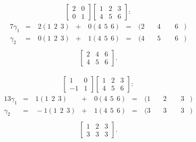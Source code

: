 \documentclass[12pt]{article}
\begin{document}
\begin{exm}
  \begin{align*}
    \begin{bmatrix}
      2 & 0\\
      0 & 1
    \end{bmatrix}
    \begin{bmatrix}
      1 & 2 & 3\\
      4 & 5 & 6
    \end{bmatrix}:
  \end{align*}
  \begin{alignat*}{7}
    \gamma_1 &=&\ 2(1\ \ 2\ \ 3) &+&\ 0(4\ \ 5\ \ 6)
      &=&\ (2&\ &4&\ \ &6&)\\
    \gamma_2 &=&\ 0(1\ \ 2\ \ 3) &+&\ 1(4\ \ 5\ \ 6)
      &=&\ (4&\ &5&\ \ &6&)\\
  \end{alignat*}
  \begin{align*}
    \begin{bmatrix}
      2 & 4 & 6\\
      4 & 5 & 6
    \end{bmatrix}.
  \end{align*}
\end{exm}

\begin{exm}
  \begin{align*}
    \begin{bmatrix}
      1 & 0\\
      -1 & 1
    \end{bmatrix}
    \begin{bmatrix}
      1 & 2 & 3\\
      4 & 5 & 6
    \end{bmatrix}:
  \end{align*}
  \begin{alignat*}{13}
    \gamma_1 &=&\ 1(1\ \ 2\ \ 3) &+&\ 0(4\ \ 5\ \ 6)
      &=&\ (1&\ &2&\ \ &3&)\\
    \gamma_2 &=&\ -1(1\ \ 2\ \ 3) &+&\ 1(4\ \ 5\ \ 6)
      &=&\ (3&\ &3&\ \ &3&)\\
  \end{alignat*}
  \begin{align*}
    \begin{bmatrix}
      1 & 2 & 3\\
      3 & 3 & 3
    \end{bmatrix}.
  \end{align*}
\end{exm}
\end{document}
